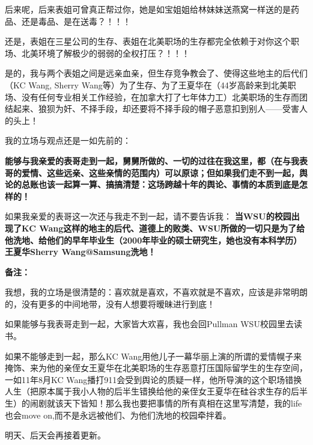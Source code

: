 \documentclass[9pt, b5paper]{article}
\begin{document}
后来呢，后来表姐可曾真正帮过你，她是如宝姐姐给林妹妹送燕窝一样送的是药品、还是毒品、是在送毒？！！！

还是，表姐在三星公司的生存、表姐在北美职场的生存都完全依赖于对你这个职场、北美环境了解极少的弱弱的全权打压？！！！

是的，我与两个表姐之间是远亲血亲，但生存竞争教会了、使得这些地主的后代们（KC Wang, Sherry Wang等）为了生存、为了王夏华在（44岁高龄来到北美职场、没有任何专业相关工作经验，在加拿大打了七年体力工）北美职场的生存而团结起来、狼狈为奸、不择手段，却还要将不择手段的帽子恶意扣到别人——受害人的头上！

我的立场与观点还是一如先前的：

\textbf{能够与我亲爱的表哥走到一起，舅舅所做的、一切的过往在我这里，都（在与我表哥的爱情、这些远亲、这些亲情的范围内）可以原谅；但如果我们走不到一起，舆论的总账也该一起算一算、搞搞清楚：这场跨越十年的舆论、事情的本质到底是怎样的！}

如果我亲爱的表哥这一次还与我走不到一起，请不要告诉我： \textbf{当WSU的校园出现了KC Wang这样的地主的后代、道德上的败类、WSU所做的一切只是为了给他洗地、给他们的早年毕业生（2000年毕业的硕士研究生，她也没有本科学历）王夏华Sherry Wang@Samsung洗地！}

\textbf{备注：}

我想，我的立场是很清楚的：喜欢就是喜欢，不喜欢就是不喜欢，应该是非常明朗的，没有更多的中间地带，没有人想要将暧昧进行到底！

如果能够与我表哥走到一起，大家皆大欢喜，我也会回Pullman WSU校园里去读书。 

如果不能够走到一起，那么KC Wang用他儿子一幕华丽上演的所谓的爱情幌子来掩饰、来为他的亲侄女王夏华在北美职场的生存恶意打压国际留学生的生存空间，一如11年8月KC Wang播打911会受到舆论的质疑一样，他所导演的这个职场错换人生（把原本属于我小人物的后半生错换给他的亲侄女王夏华在硅谷求生存的后半生）的闹剧就该天下皆知！那么我也要把事情的所有真相在这里写清楚，我的life也会move on,而不是永远被他们、为他们洗地的校园牵拌着。

明天、后天会再接着更新。
\end{document}
